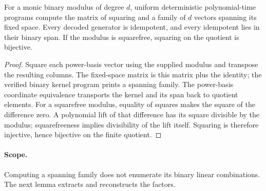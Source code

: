 \begin{lemma}
\label{lem:binary-quotient-fixed-space}
\leanok
For a monic binary modulus of degree $d$, uniform deterministic polynomial-time
programs compute the matrix of squaring and a family of $d$ vectors spanning its
fixed space. Every decoded generator is idempotent, and every idempotent lies
in their binary span. If the modulus is squarefree, squaring on the quotient is
bijective.
\end{lemma}
\begin{proof}
\leanok
Square each power-basis vector using the supplied modulus and transpose the
resulting columns. The fixed-space matrix is this matrix plus the identity;
the verified binary kernel program prints a spanning family. The power-basis
coordinate equivalence transports the kernel and its span back to quotient
elements. For a squarefree modulus, equality of squares makes the square of
the difference zero. A polynomial lift of that difference has its square
divisible by the modulus; squarefreeness implies divisibility of the lift
itself. Squaring is therefore injective, hence bijective on the finite quotient.
\end{proof}
\paragraph{Scope.} Computing a spanning family does not enumerate its binary
linear combinations. The next lemma extracts and reconstructs the factors.

